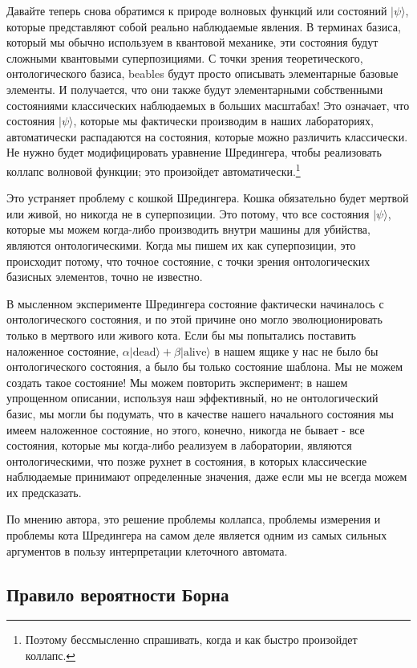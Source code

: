 \documentclass[main.tex]{subfiles}
\begin{document}
Давайте теперь снова обратимся к природе волновых функций или состояний $|\psi\rangle$, которые представляют собой реально наблюдаемые явления. В терминах базиса, который мы обычно используем в квантовой механике, эти состояния будут сложными квантовыми суперпозициями. С точки зрения теоретического, онтологического базиса, beables будут просто описывать элементарные базовые элементы. И получается, что они также будут элементарными собственными состояниями классических наблюдаемых в больших масштабах! Это означает, что состояния $|\psi\rangle$, которые мы фактически производим в наших лабораториях, автоматически распадаются на состояния, которые можно различить классически. Не нужно будет модифицировать уравнение Шредингера, чтобы реализовать коллапс волновой функции; это произойдет автоматически.\footnote{Поэтому бессмысленно спрашивать, когда и как быстро произойдет коллапс.}

Это устраняет проблему с кошкой Шредингера. Кошка обязательно будет мертвой или живой, но никогда не в суперпозиции. Это потому, что все состояния $|\psi\rangle$, которые мы можем когда-либо производить внутри машины для убийства, являются онтологическими. Когда мы пишем их как суперпозиции, это происходит потому, что точное состояние, с точки зрения онтологических базисных элементов, точно не известно.

В мысленном эксперименте Шредингера состояние фактически начиналось с онтологического состояния, и по этой причине оно могло эволюционировать только в мертвого или живого кота. Если бы мы попытались поставить наложенное состояние, $\alpha|\mathrm{dead}\rangle + \beta|\mathrm{alive}\rangle$ в нашем ящике у нас не было бы онтологического состояния, а было бы только состояние шаблона. Мы не можем создать такое состояние! Мы можем повторить эксперимент; в нашем упрощенном описании, используя наш эффективный, но не онтологический базис, мы могли бы подумать, что в качестве нашего начального состояния мы имеем наложенное состояние, но этого, конечно, никогда не бывает - все состояния, которые мы когда-либо реализуем в лаборатории, являются онтологическими, что позже рухнет в состояния, в которых классические наблюдаемые принимают определенные значения, даже если мы не всегда можем их предсказать.

По мнению автора, это решение проблемы коллапса, проблемы измерения и проблемы кота Шредингера на самом деле является одним из самых сильных аргументов в пользу интерпретации клеточного автомата.

\subsection{Правило вероятности Борна}\label{ch4.3}
\end{document}
